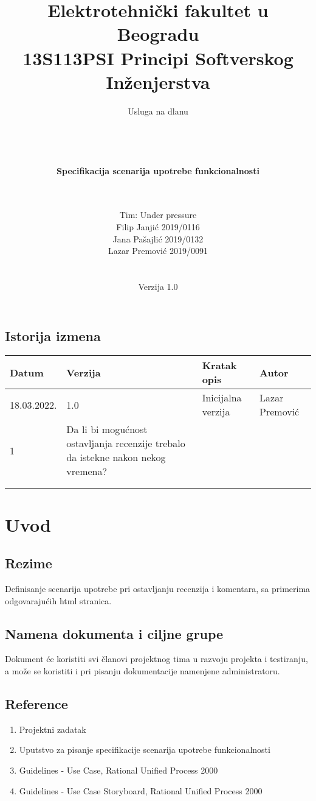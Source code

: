 \documentclass[a4paper,12pt]{report}
\title{\Large Elektrotehnički fakultet u Beogradu \\ 13S113PSI Principi Softverskog Inženjerstva}
\author{\Huge Usluga na dlanu\\ \ \\ \ \\ \ \\ \ \\
	\Large \textbf{Specifikacija scenarija upotrebe funkcionalnosti}\\\Large \textbf{\genitivfunkcionalnosti} \\ \ \\}
\date{\Large   Tim: Under pressure \\ Filip Janjić 2019/0116 \\ Jana Pašajlić 2019/0132 \\ Lazar Premović 2019/0091  \\ \  \\ \  \\
	\large Verzija 1.0}
\newcommand{\dativfunkcionalnosti }{ostavljanju recenzija i komentara}
\newcommand{\inicijalniautor}{Lazar Premović}
\newcommand{\inicijalnidatum}{18.03.2022.}
\begin{document}
	
	\maketitle
	
	\begin{center}
		\section*{Istorija izmena}
			\begin{tabular}{ |l|l|l|l| }
				\hline
				\textbf{Datum} & \textbf{Verzija} & \textbf{Kratak opis} & \textbf{Autor} \\ 
				\hline
				\inicijalnidatum & 1.0  & Inicijalna verzija & \inicijalniautor \\
				\hline
				1 & Da li bi mogućnost ostavljanja recenzije trebalo da istekne nakon nekog vremena? & &  \\
				\hline
				&  &  &  \\
				\hline
				&  &  &  \\
				\hline
			\end{tabular}
	\end{center}
	
	\newpage
	
	\tableofcontents
	
	\newpage
	
	\section{Uvod}
		\subsection{Rezime}
			Definisanje scenarija upotrebe pri \dativfunkcionalnosti, sa primerima odgovarajućih html stranica.
		\subsection{Namena dokumenta i ciljne grupe}
			Dokument će koristiti svi članovi projektnog tima u razvoju projekta i testiranju, a može se koristiti i pri pisanju dokumentacije namenjene administratoru.
		\subsection{Reference}
			\begin{enumerate}
				\item Projektni zadatak
				\item Uputstvo za pisanje specifikacije scenarija upotrebe funkcionalnosti
				\item Guidelines - Use Case, Rational Unified Process 2000
				\item Guidelines - Use Case Storyboard, Rational Unified Process 2000
			\end{enumerate}
\end{document}
